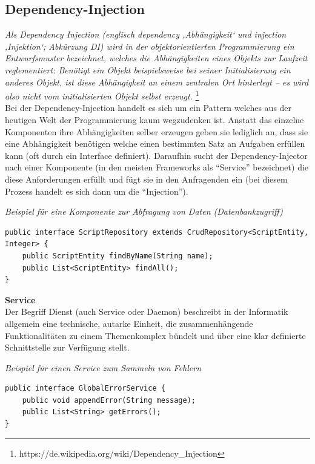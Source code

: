 \subsection{Dependency-Injection}

\emph{\glqq   
Als Dependency Injection (englisch dependency ‚Abhängigkeit‘ und injection ‚Injektion‘; Abkürzung DI) wird in der objektorientierten Programmierung ein Entwurfsmuster bezeichnet, welches die Abhängigkeiten eines Objekts zur Laufzeit reglementiert: Benötigt ein Objekt beispielsweise bei seiner Initialisierung ein anderes Objekt, ist diese Abhängigkeit an einem zentralen Ort hinterlegt – es wird also nicht vom initialisierten Objekt selbst erzeugt. \grqq} \footnote{https://de.wikipedia.org/wiki/Dependency\_Injection} \\ 

Bei der Dependency-Injection handelt es sich um ein Pattern welches aus der heutigen Welt der Programmierung kaum wegzudenken ist. Anstatt das einzelne Komponenten ihre Abhängigkeiten selber erzeugen geben sie lediglich an, dass sie eine Abhängigkeit benötigen welche einen bestimmten Satz an Aufgaben erfüllen kann (oft durch ein Interface definiert). Daraufhin sucht der Dependency-Injector nach einer Komponente (in den meisten Frameworks als ``Service'' bezeichnet) die diese Anforderungen erfüllt und fügt sie in den Anfragenden ein (bei diesem Prozess handelt es sich dann um die ``Injection''). \\

\begin{minipage}{\textwidth}
\emph{Beispiel für eine Komponente zur Abfragung von Daten (Datenbankzugriff)}
\begin{lstlisting}
public interface ScriptRepository extends CrudRepository<ScriptEntity, Integer> {
	public ScriptEntity findByName(String name);
	public List<ScriptEntity> findAll();
}
\end{lstlisting} 
\end{minipage}


\textbf{Service}\\
Der Begriff Dienst (auch Service oder Daemon) beschreibt in der Informatik allgemein eine technische, autarke Einheit, die zusammenhängende Funktionalitäten zu einem Themenkomplex bündelt und über eine klar definierte Schnittstelle zur Verfügung stellt.\\
 
\begin{minipage}{\textwidth}
\emph{Beispiel für einen Service zum Sammeln von Fehlern}
\begin{lstlisting}
public interface GlobalErrorService {
	public void appendError(String message);
	public List<String> getErrors();
}
\end{lstlisting}
\end{minipage}

